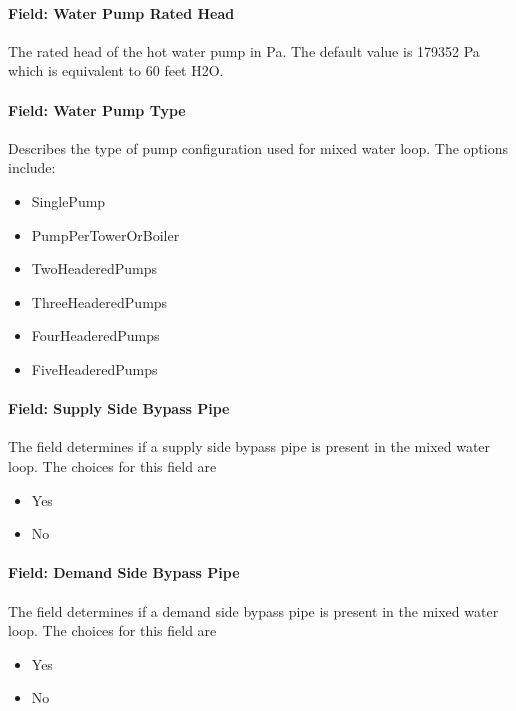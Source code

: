 \paragraph{Field: Water Pump Rated Head}\label{field-water-pump-rated-head}

The rated head of the hot water pump in Pa. The default value is 179352 Pa which is equivalent to 60 feet H2O.

\paragraph{Field: Water Pump Type}\label{field-water-pump-type}

Describes the type of pump configuration used for mixed water loop. The options include:

\begin{itemize}
\item
  SinglePump
\item
  PumpPerTowerOrBoiler
\item
  TwoHeaderedPumps
\item
  ThreeHeaderedPumps
\item
  FourHeaderedPumps
\item
  FiveHeaderedPumps
\end{itemize}

\paragraph{Field: Supply Side Bypass Pipe}\label{field-supply-side-bypass-pipe-1}

The field determines if a supply side bypass pipe is present in the mixed water loop. The choices for this field are

\begin{itemize}
\item
  Yes
\item
  No
\end{itemize}

\paragraph{Field: Demand Side Bypass Pipe}\label{field-demand-side-bypass-pipe-1}

The field determines if a demand side bypass pipe is present in the mixed water loop. The choices for this field are

\begin{itemize}
\item
  Yes
\item
  No
\end{itemize}


